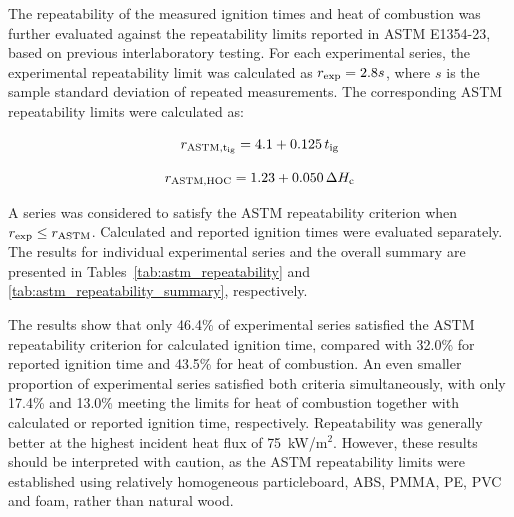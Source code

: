 \documentclass{book}
\begin{document}
\begin{table}[htbp]
  \centering
\caption{Comparison of interlaboratory ranges of ignition time and heat of combustion reported in MaCFP-2 and obtained in MaCFP-4. Values in parentheses indicate the relative range, calculated as the difference between the maximum and minimum laboratory means divided by the midpoint of their range.}
  \label{tab:macfp2_ranges}
  \small
  
\end{table}

The repeatability of the measured ignition times and heat of combustion was further evaluated against the repeatability limits reported in ASTM E1354-23, based on previous interlaboratory testing. For each experimental series, the experimental repeatability limit was calculated as $r_{\rm exp}=2.8s$, where $s$ is the sample standard deviation of repeated measurements. The corresponding ASTM repeatability limits were calculated as:

\begin{equation}
r_{\rm ASTM,t_{ig}} = 4.1 + 0.125\,t_{\rm ig}
\end{equation}

\begin{equation}
r_{\rm ASTM,HOC} = 1.23 + 0.050\,\Delta H_{\rm c}
\end{equation}

A series was considered to satisfy the ASTM repeatability criterion when $r_{\rm exp} \leq r_{\rm ASTM}$. Calculated and reported ignition times were evaluated separately. The results for individual experimental series and the overall summary are presented in Tables~\ref{tab:astm_repeatability} and \ref{tab:astm_repeatability_summary}, respectively.

The results show that only 46.4\% of experimental series satisfied the ASTM repeatability criterion for calculated ignition time, compared with 32.0\% for reported ignition time and 43.5\% for heat of combustion. An even smaller proportion of experimental series satisfied both criteria simultaneously, with only 17.4\% and 13.0\% meeting the limits for heat of combustion together with calculated or reported ignition time, respectively. Repeatability was generally better at the highest incident heat flux of 75~kW/m$^2$. However, these results should be interpreted with caution, as the ASTM repeatability limits were established using relatively homogeneous particleboard, ABS, PMMA, PE, PVC and foam, rather than natural wood.
\end{document}

